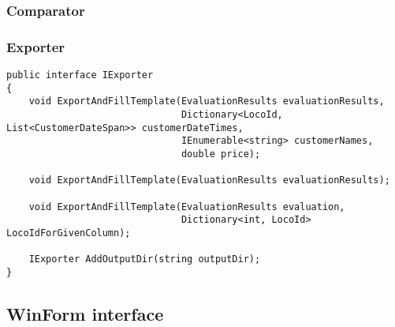 \documentclass[11pt]{article}
\begin{document}
\subsubsection{Comparator}
\label{sec:Comparator}

\pagebreak

\subsubsection{Exporter}
\label{sec:Exporter}

\begin{verbatim}
public interface IExporter
{
    void ExportAndFillTemplate(EvaluationResults evaluationResults,
                               Dictionary<LocoId, List<CustomerDateSpan>> customerDateTimes, 
                               IEnumerable<string> customerNames, 
                               double price);

    void ExportAndFillTemplate(EvaluationResults evaluationResults);

    void ExportAndFillTemplate(EvaluationResults evaluation, 
                               Dictionary<int, LocoId> LocoIdForGivenColumn);

    IExporter AddOutputDir(string outputDir);
}
\end{verbatim}

\subsection{WinForm interface}
\label{sec:WinFormInterface}
\end{document}
